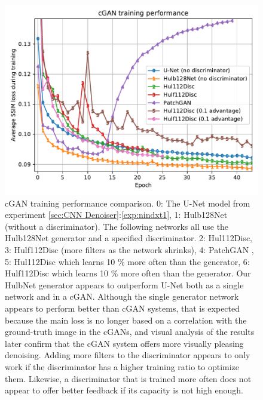 \begin{figure}[!htbp]
\centering
\includegraphics[width=1\linewidth]{gfx/graphs/cgan-comp.pdf}
\caption[cGAN learning curve]{
cGAN training performance comparison. 0: The U-Net model from experiment \ref{sec:CNN Denoiser}:\ref{exp:nindxt1}, 1: Hulb128Net (without a discriminator). The following networks all use the Hulb128Net generator and a specified discriminator. 2: Hul112Disc, 3: Hulf112Disc (more filters as the network shrinks), 4: PatchGAN \cite{pix2pix}, 5: Hul112Disc which learns 10 \% more often than the generator, 6: Hulf112Disc which learns 10 \% more often than the generator.
Our HulbNet generator appears to outperform U-Net both as a single network and in a \acs{cGAN}. Although the single generator network appears to perform better than \ac{cGAN} systems, that is expected because the main loss is no longer based on a correlation with the ground-truth image in the \acp{cGAN}, and visual analysis of the results later confirm that the \acs{cGAN} system offers more visually pleasing denoising. Adding more filters to the discriminator appears to only work if the discriminator has a higher training ratio to optimize them. Likewise, a discriminator that is trained more often does not appear to offer better feedback if its capacity is not high enough.}
\label{fig:cgan-comp}
\end{figure}

